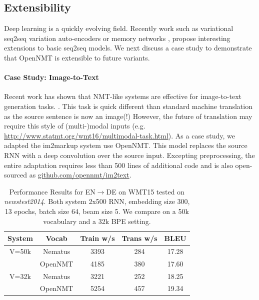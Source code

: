 \documentclass[11pt]{article}
\begin{document}
\subsection{Extensibility}

Deep learning is a quickly evolving field. Recently work such as
variational seq2seq variation auto-encoders
\cite{DBLP:conf/conll/BowmanVVDJB16} or memory networks
\cite{DBLP:journals/corr/WestonCB14}, propose interesting extensions
to basic seq2seq models. We next discuss a case study to demonstrate that OpenNMT
is extensible to future variants.





\paragraph{Case Study: Image-to-Text}

Recent work has shown that NMT-like systems are effective for
image-to-text generation tasks.
\cite{DBLP:journals/corr/XuBKCCSZB15}. This task is quick different
than standard machine translation as the source sentence is now an
image(!)  However, the future of translation may require this style of
(multi-)modal inputs
(e.g. \url{http://www.statmt.org/wmt16/multimodal-task.html}).  As a
case study, we adapted the im2markup system
\cite{DBLP:journals/corr/DengKR16} use OpenNMT.  This model replaces
the source RNN with a deep convolution over the source input. Excepting preprocessing, the entire adaptation
requires less than 500 lines of additional code and is also open-sourced as
\url{github.com/opennmt/im2text}.


\begin{table}[ht]
 \small
  \centering
  \begin{tabular}{ccccc}
    \toprule
    System & Vocab & Train w/s & Trans w/s & BLEU \\
    \midrule
 V=50k & Nematus  & 3393 & 284 & 17.28 \\
     & OpenNMT  &4185 & 380 & 17.60 \\ 
    \midrule 
  V=32k & Nematus & 3221& 252 & 18.25 \\
    & OpenNMT &5254 & 457 & 19.34\\ 
    \bottomrule
  \end{tabular}
  \label{tab:res}
  \caption{\small Performance Results for EN$\rightarrow$DE on WMT15 tested on \textit{newstest2014}. Both system 2x500 RNN, embedding size 300, 13 epochs, batch size 64, beam size 5. We compare on a 50k vocabulary and a 32k BPE setting.}
\end{table}
\end{document}
